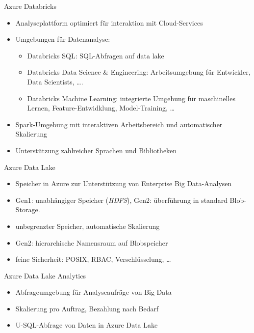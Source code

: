 \begin{flashcard}[Definition]{Azure Databricks}
  \begin{itemize}
    \item Analyseplattform optimiert für interaktion mit Cloud-Services
    \item Umgebungen für Datenanalyse:
      \begin{itemize}
        \item Databricks SQL: SQL-Abfragen auf data lake
        \item Databricks Data Science \& Engineering: Arbeitsumgebung für Entwickler, Data Scientists, \ldots.
        \item Databricks Machine Learning: integrierte Umgebung für maschinelles Lernen, Feature-Entwidklung, Model-Training, \ldots
      \end{itemize}
      \item Spark-Umgebung mit interaktiven Arbeitsbereich und automatischer Skalierung
      \item Unterstützung zahlreicher Sprachen und Bibliotheken
  \end{itemize}
\end{flashcard}

\begin{flashcard}[Definition]{Azure Data Lake}
  \begin{itemize}
    \item Speicher in Azure zur Unterstützung von Enterprise Big Data-Analysen
    \item Gen1: unabhängiger Speicher (\emph{HDFS}), Gen2: überführung in standard Blob-Storage.
    \item unbegrenzter Speicher, automatische Skalierung
    \item Gen2: hierarchische Namensraum auf Blobspeicher
    \item feine Sicherheit: POSIX, RBAC, Verschlüsselung, \ldots
  \end{itemize}
\end{flashcard}

\begin{flashcard}[Definition]{Azure Data Lake Analytics}
  \begin{itemize}
    \item Abfrageumgebung für Analyseaufräge von Big Data
    \item Skalierung pro Auftrag, Bezahlung nach Bedarf
    \item U-SQL-Abfrage von Daten in Azure Data Lake
  \end{itemize}
\end{flashcard}

